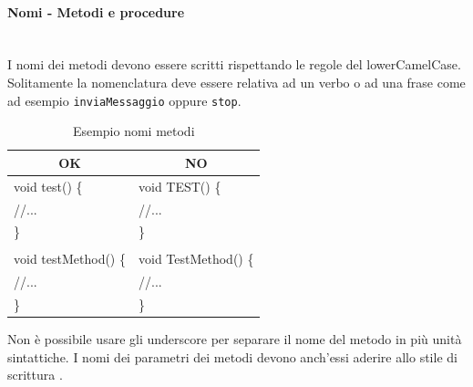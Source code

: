 \paragraph{Nomi - Metodi e procedure}\mbox{}\\[0.4cm]
I nomi dei metodi devono essere scritti rispettando le regole del lowerCamelCase. Solitamente la nomenclatura deve essere relativa ad un verbo o ad una frase come ad esempio \texttt{inviaMessaggio} oppure \texttt{stop}.
\begin{table} [H]
	\begin{center}
		\begin{tabular}{ | l | l |}
			\multicolumn{1}{c}{\textbf{OK}}&\multicolumn{1}{c}{\textbf{NO}}\\ 
			\hline
			void test() \{& void TEST() \{\\
			\hspace{0.5cm} //... & \hspace{0.5cm} //...\\
			\}&\}\\
			&\\
			void testMethod() \{ & void TestMethod() \{ \\
			\hspace{0.5cm} //... & \hspace{0.5cm} //... \\
			\}&\}\\
			\hline
		\end{tabular}
	\end{center}
	\caption{Esempio nomi metodi}
\end{table}
Non è possibile usare gli underscore per separare il nome del metodo in più unità sintattiche. I nomi dei parametri dei metodi devono anch’essi aderire allo stile di scrittura .

